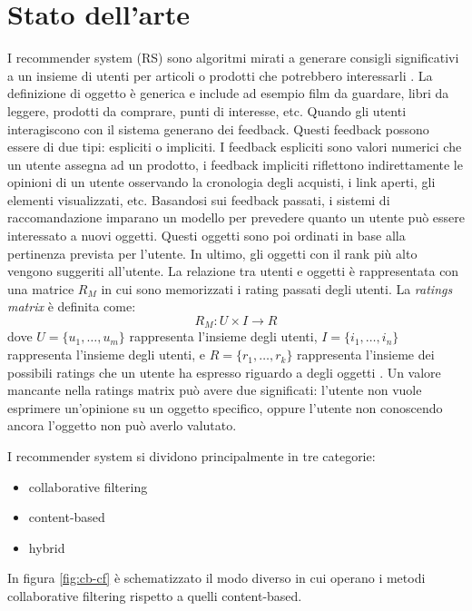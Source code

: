\documentclass[12pt,italian]{report}
\begin{document}
\chapter{Stato dell'arte}
\label{chap:stato_arte}
I recommender system (RS) sono algoritmi mirati a generare consigli significativi a un insieme di utenti per articoli o prodotti che potrebbero interessarli \cite{recsys-definition}. La definizione di oggetto è generica e include ad esempio film da guardare, libri da leggere, prodotti da comprare, punti di interesse, etc. 
Quando gli utenti interagiscono con il sistema generano dei feedback. Questi feedback possono essere di due tipi: espliciti o impliciti. I feedback espliciti sono valori numerici che un utente assegna ad un prodotto, i feedback impliciti riflettono indirettamente le opinioni di un utente osservando la cronologia degli acquisti, i link aperti, gli elementi visualizzati, etc.
Basandosi sui feedback passati, i sistemi di raccomandazione imparano un modello per prevedere quanto un utente può essere interessato a nuovi oggetti. Questi oggetti sono poi ordinati in base alla pertinenza prevista per l'utente. In ultimo, gli oggetti con il rank più alto vengono suggeriti all'utente. La relazione tra utenti e oggetti è rappresentata con una matrice $R_M$ in cui sono memorizzati i rating passati degli utenti.
La \textit{ratings matrix} è definita come: 
$$
R_M: U \times I \rightarrow R
$$
dove $U = \{u_1, \dots, u_m\}$ rappresenta l'insieme degli utenti, $I = \{i_1,\dots, i_n\}$ rappresenta l'insieme degli utenti, e $R = \{r_1, \dots, r_k\}$ rappresenta l'insieme dei possibili ratings che un utente ha espresso riguardo a degli oggetti \cite{survey-mattia}. Un valore mancante nella ratings matrix può avere due significati: l'utente non vuole esprimere un'opinione su un oggetto specifico, oppure l'utente non conoscendo ancora l'oggetto non può averlo valutato.

\vspace{5mm}
\noindent I recommender system si dividono principalmente in tre categorie:
\begin{itemize}
	\item collaborative filtering
	\item content-based
	\item hybrid
\end{itemize}

\noindent In figura \autoref{fig:cb-cf} è schematizzato il modo diverso in cui operano i metodi collaborative filtering rispetto a quelli content-based.
\end{document}
